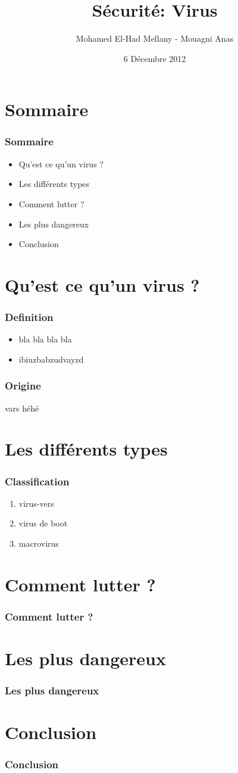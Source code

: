 \documentclass{beamer}
\title{Sécurité: Virus}
\author{Mohamed El-Had Mellany - Mouagni Anas}
\institute{UM2}
\date{6 Décembre 2012}
\begin{document}
\begin{frame}
	\titlepage
\end{frame}

\section*{Sommaire}
\begin{frame}
	\frametitle{Sommaire}
	\begin{itemize}
		\pause\item Qu'est ce qu'un virus ?
		\pause\item Les différents types
		\pause\item Comment lutter ?
		\pause\item Les plus dangereux
		\pause\item Conclusion
	\end{itemize}
\end{frame}


\section*{Qu'est ce qu'un virus ?}
\begin{frame}
	\frametitle{Definition}
	\begin{itemize}
		\item bla bla bla bla
		\pause\item ibiuzbabzudvayzd
	\end{itemize}
\end{frame}

\begin{frame}
	\frametitle{Origine}
	vars héhé
\end{frame}


\section*{Les différents types}
\begin{frame}
	\frametitle{Classification}
	\begin{enumerate}
		\item virus-vers
		\pause\item virus de boot
		\pause\item macrovirus
	\end{enumerate}
\end{frame}


\section*{Comment lutter ?}
\begin{frame}
	\frametitle{Comment lutter ?}
\end{frame}


\section*{Les plus dangereux}
\begin{frame}
	\frametitle{Les plus dangereux}
\end{frame}


\section*{Conclusion}
\begin{frame}
	\frametitle{Conclusion}
\end{frame}
\end{document}
